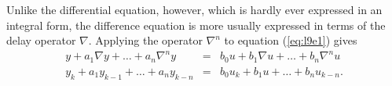 Unlike the differential equation, however, which is hardly ever
expressed in an integral form, the difference equation is more
usually expressed in terms of the delay operator $\nabla$.
Applying the operator $\nabla^n$ to equation (\ref{eq:l9e1}) gives
\begin{eqnarray}\label{eq:l9e3}
y + a_{1}\nabla y + \ldots  + a_n \nabla^n y &=& b_0 u +
b_{1}\nabla u + \ldots +  b_n\nabla^n u\\
  y_{k} + a_{1}y_{k-1} + \ldots +  a_n y_{k-n}
   &=& b_0
   u_{k} + b_{1} u + \ldots + b_n u_{k-n}.\label{eq:19e4}
   \end{eqnarray}
\endinput
